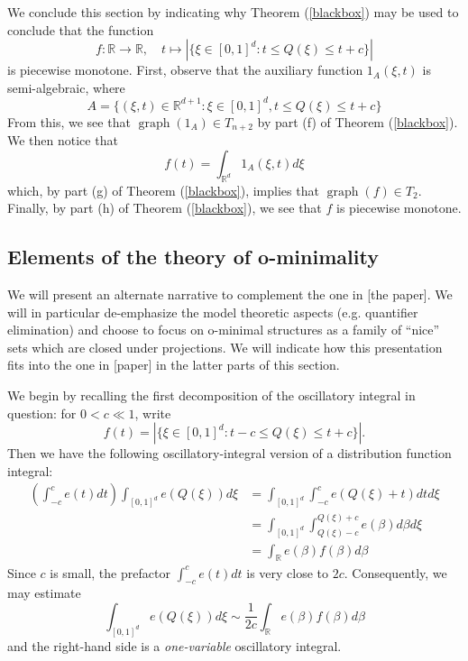 \documentclass[12pt]{article}
\let\oldref\ref
\renewcommand{\ref}[1]{(\oldref{#1})}
\newcommand{\R}{\mathbb{R}}
\theoremstyle{definition}
\theoremstyle{remark}
\numberwithin{equation}{section}
\begin{document}
We conclude this section by indicating why Theorem \ref{blackbox} may be used to conclude that the function
\begin{equation}\label{levelmeasure}
    f:\R\to\R,\quad t\mapsto|\{\xi\in[0,1]^d:t\leq Q(\xi)\leq t+c\}|
\end{equation}
is piecewise monotone. First, observe that the auxiliary function $1_A(\xi,t)$ is semi-algebraic, where
\begin{equation*}
    A=\{(\xi,t)\in\R^{d+1}:\xi\in[0,1]^d,t\leq Q(\xi)\leq t+c\}
\end{equation*}
From this, we see that $\operatorname{graph}(1_A)\in T_{n+2}$ by part (f) of Theorem \ref{blackbox}. We then notice that
\begin{equation*}
    f(t)=\int_{\R^d}1_A(\xi,t)d\xi
\end{equation*}
which, by part (g) of Theorem \ref{blackbox}, implies that $\operatorname{graph}(f)\in T_2$. Finally, by part (h) of Theorem \ref{blackbox}, we see that $f$ is piecewise monotone.

\subsection{Elements of the theory of o-minimality}\label{ominintrosubsection}

\iffalse

We will present an alternate narrative to complement the one in [the paper]. We will in particular de-emphasize the model theoretic aspects (e.g. quantifier elimination) and choose to focus on o-minimal structures as a family of ``nice'' sets which are closed under projections. We will indicate how this presentation fits into the one in [paper] in the latter parts of this section.

We begin by recalling the first decomposition of the oscillatory integral in question: for $0<c\ll 1$, write
\begin{equation*}
    f(t)=|\{\xi\in[0,1]^d: t-c\leq Q(\xi)\leq t+c\}|.
\end{equation*}
Then we have the following oscillatory-integral version of a distribution function integral:
\begin{equation*}
    \begin{split}
    \left(\int_{-c}^ce(t)dt\right)\int_{[0,1]^d}e(Q(\xi))d\xi&=\int_{[0,1]^d}\int_{-c}^ce(Q(\xi)+t)dtd\xi\\
    &=\int_{[0,1]^d}\int_{Q(\xi)-c}^{Q(\xi)+c}e(\beta)d\beta d\xi\\
    &=\int_{\R}e(\beta)f(\beta)d\beta
    \end{split}
\end{equation*}
Since $c$ is small, the prefactor $\int_{-c}^ce(t)dt$ is very close to $2c$. Consequently, we may estimate
\begin{equation*}
    \int_{[0,1]^d}e(Q(\xi))d\xi\sim\frac{1}{2c}\int_\R e(\beta)f(\beta)d\beta
\end{equation*}
and the right-hand side is a \textit{one-variable} oscillatory integral.
\end{document}
